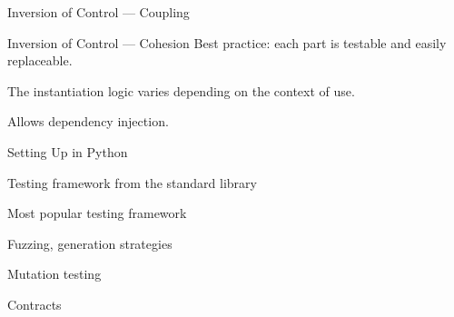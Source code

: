   \begin{frame}{Inversion of Control --- Coupling}
  \end{frame}
  
  \begin{frame}{Inversion of Control --- Cohesion}
  Best practice: each part is testable and easily replaceable.
  
  The instantiation logic varies depending on the context of use.
  
  Allows dependency injection.
  
  \end{frame}
  
  \begin{frame}{Setting Up in Python}
  \begin{description}[<+->]
  \item[\texttt{unittest}] Testing framework from the standard library
  \item[\texttt{pytest}] Most popular testing framework
  \item[\texttt{hypothesis}] Fuzzing, generation strategies
  \item[\texttt{mutmut}] Mutation testing
  \item[\texttt{deal}] Contracts
  \end{description}
  
  \end{frame}